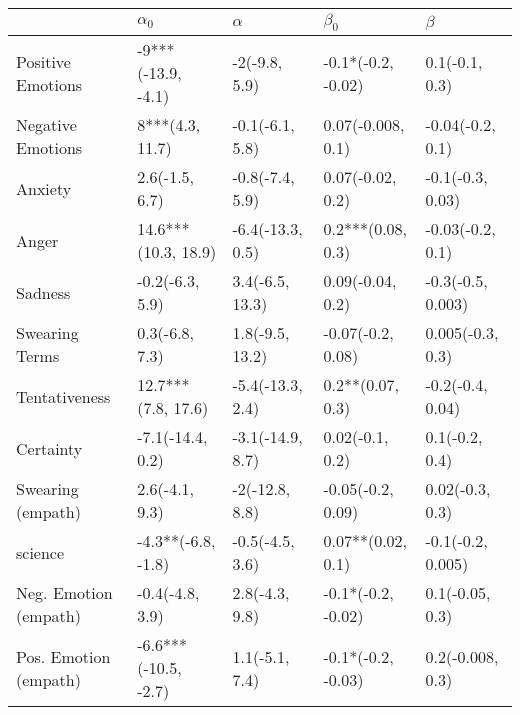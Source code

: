 \begin{tabular}{lllll}
\toprule
{} &            $\alpha_0$ &          $\alpha$ &           $\beta_0$ &            $\beta$ \\
\midrule
Positive Emotions     &    -9***(-13.9, -4.1) &     -2(-9.8, 5.9) &  -0.1*(-0.2, -0.02) &     0.1(-0.1, 0.3) \\
Negative Emotions     &       8***(4.3, 11.7) &   -0.1(-6.1, 5.8) &   0.07(-0.008, 0.1) &   -0.04(-0.2, 0.1) \\
Anxiety               &        2.6(-1.5, 6.7) &   -0.8(-7.4, 5.9) &    0.07(-0.02, 0.2) &   -0.1(-0.3, 0.03) \\
Anger                 &   14.6***(10.3, 18.9) &  -6.4(-13.3, 0.5) &   0.2***(0.08, 0.3) &   -0.03(-0.2, 0.1) \\
Sadness               &       -0.2(-6.3, 5.9) &   3.4(-6.5, 13.3) &    0.09(-0.04, 0.2) &  -0.3(-0.5, 0.003) \\
Swearing Terms        &        0.3(-6.8, 7.3) &   1.8(-9.5, 13.2) &   -0.07(-0.2, 0.08) &   0.005(-0.3, 0.3) \\
Tentativeness         &    12.7***(7.8, 17.6) &  -5.4(-13.3, 2.4) &    0.2**(0.07, 0.3) &   -0.2(-0.4, 0.04) \\
Certainty             &      -7.1(-14.4, 0.2) &  -3.1(-14.9, 8.7) &     0.02(-0.1, 0.2) &     0.1(-0.2, 0.4) \\
Swearing (empath)     &        2.6(-4.1, 9.3) &    -2(-12.8, 8.8) &   -0.05(-0.2, 0.09) &    0.02(-0.3, 0.3) \\
science               &    -4.3**(-6.8, -1.8) &   -0.5(-4.5, 3.6) &   0.07**(0.02, 0.1) &  -0.1(-0.2, 0.005) \\
Neg. Emotion (empath) &       -0.4(-4.8, 3.9) &    2.8(-4.3, 9.8) &  -0.1*(-0.2, -0.02) &    0.1(-0.05, 0.3) \\
Pos. Emotion (empath) &  -6.6***(-10.5, -2.7) &    1.1(-5.1, 7.4) &  -0.1*(-0.2, -0.03) &   0.2(-0.008, 0.3) \\
\bottomrule
\end{tabular}

